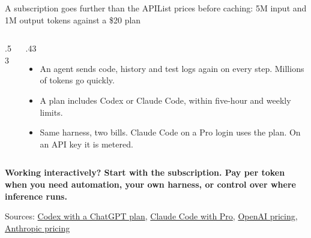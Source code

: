 \documentclass[aspectratio=169]{beamer}
\newcommand{\srcmulti}[1]{\par\vfill{\fontsize{7}{8}\selectfont\color{ACINgray}Sources: #1}}
\begin{document}
\begin{frame}{A subscription goes further than the API}{List prices before caching: 5M input and 1M output tokens against a \$20 plan}
\begin{columns}[T,onlytextwidth]
\begin{column}{.53\textwidth}
\end{column}
\hfill
\begin{column}{.43\textwidth}
\small
\begin{itemize}\itemsep4pt
  \item An agent sends code, history and test logs again on every step. Millions of tokens go quickly.
  \item A plan includes Codex or Claude Code, within five-hour and weekly limits.
  \item Same harness, two bills. Claude Code on a Pro login uses the plan. On an API key it is metered.
\end{itemize}
\end{column}
\end{columns}
\vspace{3mm}
{\color{ACINred}\small\bfseries Working interactively? Start with the subscription. Pay per token when you need automation, your own harness, or control over where inference runs.}
\srcmulti{\href{https://help.openai.com/en/articles/11369540-using-codex-with-your-chatgpt-plan}{Codex with a ChatGPT plan}, \href{https://support.claude.com/en/articles/11145838-use-claude-code-with-your-pro-or-max-plan}{Claude Code with Pro}, \href{https://developers.openai.com/api/docs/pricing}{OpenAI pricing}, \href{https://www.anthropic.com/pricing}{Anthropic pricing}}
\end{frame}
\end{document}
